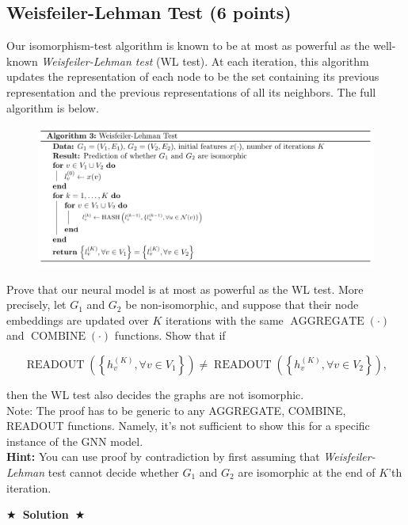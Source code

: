 \documentclass{article}
\numberwithin{figure}{section}
\newcommand{\Solution}[1]{{\medskip \color{red} \bf $\bigstar$~\sf \textbf{Solution}~$\bigstar$ \sf #1 } \bigskip}
\begin{document}
\subsection{Weisfeiler-Lehman Test (6 points)}
Our isomorphism-test algorithm is known to be at most as powerful as the well-known \textit{Weisfeiler-Lehman test} (WL test). At each iteration, this algorithm updates the representation of each node to be the set containing its previous representation and the previous representations of all its neighbors. The full algorithm is below.

    \begin{figure}[H]
        \centering
        \includegraphics[width=1.0\textwidth]{CS224W_Homework1/algo-3.png}
        \label{fig:my_label}
    \end{figure}

    Prove that our neural model is at most as powerful as the WL test. More precisely, let $G_1$ and $G_2$ be non-isomorphic, and suppose that their node embeddings are updated over $K$ iterations with the same $\operatorname{AGGREGATE}(\cdot)$ and $\operatorname{COMBINE}(\cdot)$ functions. Show that if

    $$\operatorname { READOUT }\left(\left\{h_v^{(K)}, \forall v \in V_1\right\}\right) \neq \operatorname { READOUT }\left(\left\{h_v^{(K)}, \forall v \in V_2\right\}\right),$$

then the WL test also decides the graphs are not isomorphic.\\

Note: The proof has to be generic to any AGGREGATE, COMBINE, READOUT functions. Namely, it's not sufficient to show this for a specific instance of the GNN model.\\

\textbf{Hint:} You can use proof by contradiction by first assuming that \textit{Weisfeiler-Lehman} test cannot decide whether $G_1$ and $G_2$ are isomorphic at the end of $K$’th iteration.

\Solution{}
\end{document}
